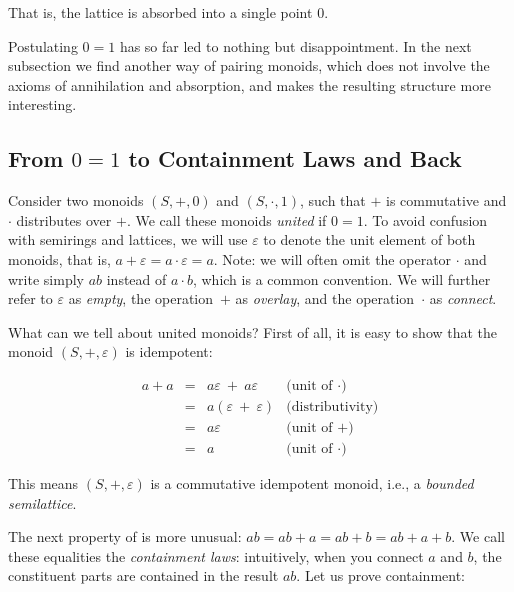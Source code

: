 \documentclass[crc,english]{programming}
\begin{document}
\noindent
That is, the lattice is absorbed into a single point $0$.

Postulating $0 = 1$ has so far led to nothing but disappointment. In the
next subsection we find another way of pairing monoids, which does not involve
the axioms of annihilation and absorption, and makes the resulting structure
more interesting.

\subsection{From $0=1$ to Containment Laws and Back}

Consider two monoids $(S, +, 0)$ and $(S, \cdot, 1)$, such that $+$ is
commutative and $\cdot$ distributes over $+$. We call these monoids
\emph{united} if $0 = 1$. To avoid confusion with semirings and lattices, we
will use $\varepsilon$ to denote the unit element of both monoids, that is,
$a + \varepsilon = a \cdot \varepsilon = a$. Note: we will often omit the
operator $\cdot$ and write simply $\textit{ab}$ instead of $a \cdot b$, which is
a common convention. We will further refer to $\varepsilon$ as \emph{empty}, the
operation~$+$ as \emph{overlay}, and the operation~$\cdot$ as \emph{connect}.

What can we tell about united monoids? First of all, it is easy to show that the
monoid $(S, +, \varepsilon)$ is idempotent:

\vspace{-5mm}
\begin{equation*}
\begin{array}{rcll}
a + a & = & a\varepsilon\ +\ a\varepsilon & \text{(unit of $\cdot$)}\\
 & = & a(\varepsilon\ +\ \varepsilon) & \text{(distributivity)}\\
 & = & a\varepsilon & \text{(unit of $+$)}\\
 & = & a & \text{(unit of $\cdot$)}
\end{array}
\end{equation*}
\vspace{-3mm}

\noindent
This means $(S, +, \varepsilon)$ is a commutative idempotent monoid, i.e.,
a \emph{bounded semilattice}.

The next property of is more unusual:
$\textit{ab} = \textit{ab} + a = \textit{ab} + b = \textit{ab} + a + b$. We
call these equalities the \emph{containment laws}: intuitively, when you
connect $a$ and $b$, the constituent parts are contained in the result
$\textit{ab}$. Let us prove containment:
\end{document}
